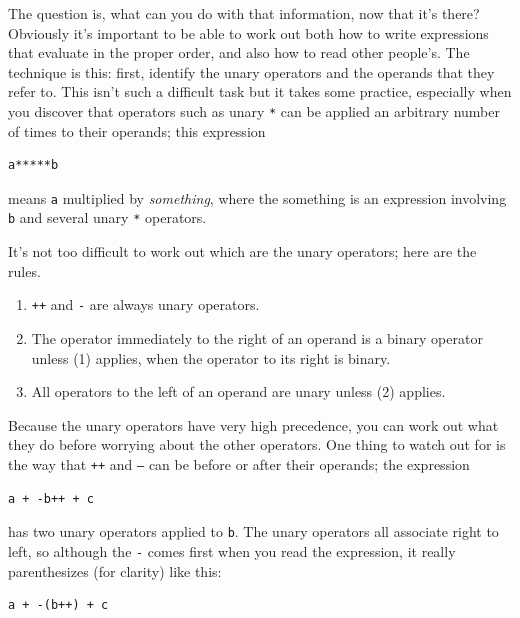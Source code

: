    The question is, what can you do with that information, now that it's
    there? Obviously it's important to be able to work out both how to write
    expressions that evaluate in the proper order, and also how to read other
    people's. The technique is this: first, identify the unary operators and
    the operands that they refer to. This isn't such a difficult task but it
    takes some practice, especially when you discover that operators such as
    unary \texttt{*} can be applied an arbitrary number of times to
    their operands; this expression


   \begin{Verbatim}
a*****b
\end{Verbatim}

   means \texttt{a} multiplied by \textit{something}, where the
    something is an expression involving \texttt{b} and several
    unary \texttt{*} operators.


   It's not too difficult to work out which are the unary operators; here
    are the rules.


   \begin{enumerate}
    \item \texttt{++} and \texttt{-} are always unary
     operators.
    \item The operator immediately to the right of an operand is a binary
     operator unless (1) applies, when the operator to its right is
     binary.
    \item All operators to the left of an operand are unary unless
     (2) applies.
   \end{enumerate}

   Because the unary operators have very high precedence, you can work out
    what they do before worrying about the other operators. One thing to watch
    out for is the way that \texttt{++} and \texttt{--} can
    be before or after their operands; the expression


   \begin{Verbatim}
a + -b++ + c
\end{Verbatim}

   has two unary operators applied to \texttt{b}. The unary
    operators all associate right to left, so although the \texttt{-}
    comes first when you read the expression, it really parenthesizes (for
    clarity) like this:


   \begin{Verbatim}
a + -(b++) + c
\end{Verbatim}

